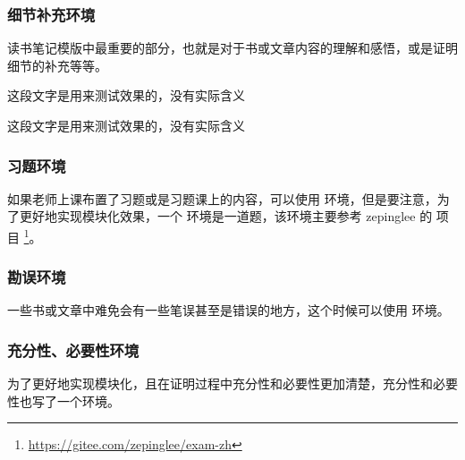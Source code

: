 \documentclass{xdyy-usermanual}
\begin{document}
\subsubsection{ 细节补充环境  }

读书笔记模版中最重要的部分，也就是对于书或文章内容的理解和感悟，或是证明细节的补充等等。


\begin{latexcode}
    \begin{detail}[
      paper   = {Function analysis notes},   %
      page = {103},                          %
      author = {许全华},                     %
      edition = {第一版},                    %
      year = {2017},                         %
      original = {                           %
        ...
      }
    ]
      这段文字是用来测试效果的，没有实际含义
    \end{detail}
\end{latexcode}

\begin{latexcode}
    \begin{detail}[
      book = {《泛函分析讲义》},  %
      page = {103},               %
      author = {许全华},          %
      edition = {第一版},         %
      year = {2017},              %
      original = {                %
        ...
      }
    ]
      这段文字是用来测试效果的，没有实际含义
    \end{detail}
\end{latexcode}



\subsubsection{ 习题环境  }

如果老师上课布置了习题或是习题课上的内容，可以使用  环境，但是要注意，为了更好地实现模块化效果，一个  环境是一道题，该环境主要参考 zepinglee 的  项目 \footnote{ \url{https://gitee.com/zepinglee/exam-zh}}。



\subsubsection{ 勘误环境  }

一些书或文章中难免会有一些笔误甚至是错误的地方，这个时候可以使用  环境。



\subsubsection{ 充分性、必要性环境  }

为了更好地实现模块化，且在证明过程中充分性和必要性更加清楚，充分性和必要性也写了一个环境。
\end{document}
